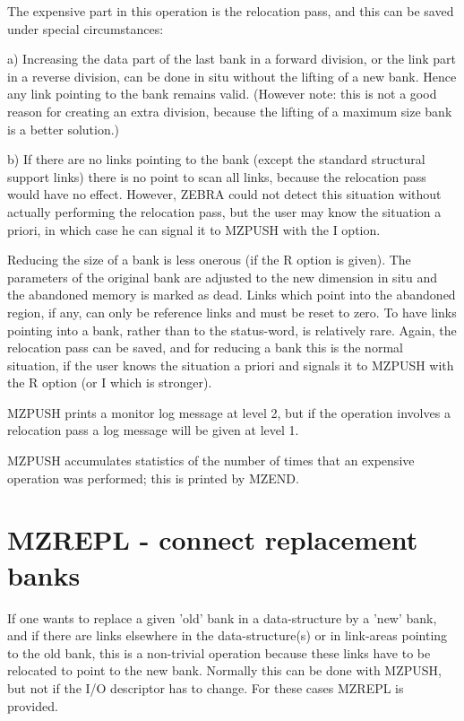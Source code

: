 The expensive part in this operation is the relocation pass,
and this can be saved under special circumstances:

 a) Increasing the data part of the last bank in a forward division,
or the link part in a reverse division,
can be done in situ without the lifting of a new bank.
Hence any link pointing to the bank remains valid.
(However note: this is not a good reason for creating an extra
division, because the lifting of a maximum size bank is
a better solution.)

 b) If there are no links pointing to the bank (except the
standard structural support links)
there is no point to scan all links,
because the relocation pass would have no effect.
However, ZEBRA could not detect this situation without actually
performing the relocation pass,
but the user may know the situation a priori,
in which case he can signal it to MZPUSH with the I option.

Reducing the size of a bank is less onerous (if
the R option is given).
The parameters of the original bank are adjusted to the
new dimension in situ and the abandoned memory is marked as dead.
Links which point into the abandoned region, if any,
can only be reference links and must be reset to zero.
To have links pointing into a bank, rather than to the status-word,
is relatively rare.
Again, the relocation pass can be saved,
and for reducing a bank this is the normal situation,
if the user knows the situation a priori and signals it to
MZPUSH with the R option (or I which is stronger).

MZPUSH prints a monitor log message at level 2,
but if the operation involves a relocation pass a log message
will be given at level 1.

MZPUSH accumulates statistics of the number of times that an
expensive operation was performed;
this is printed by MZEND.

\section{MZREPL - connect replacement banks}

If one wants to replace a given 'old' bank in a data-structure
by a 'new' bank,
and if there are links elsewhere in the data-structure(s)
or in link-areas pointing to the old bank,
this is a non-trivial operation because these links
have to be relocated to point to the new bank.
Normally this can be done with MZPUSH,
but not if the I/O descriptor has to change.
For these cases MZREPL is provided.

